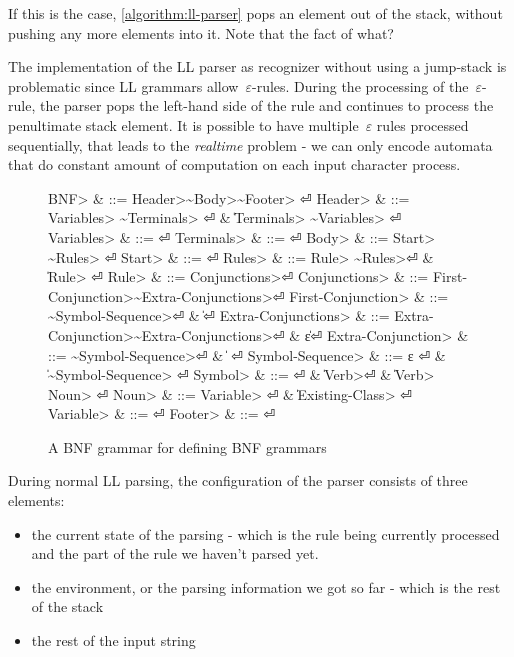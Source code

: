 If this is the case, \cref{algorithm:ll-parser}
pops an element out of the stack, without pushing any more elements into it.
Note that the fact of what?

The implementation of the LL parser as recognizer without using
a jump-stack is problematic since LL grammars allow~$ε$-rules.
During the processing of the~$ε$-rule, the parser pops the
left-hand side of the rule and continues to process the penultimate
stack element.
It is possible to have multiple~$ε$ rules processed sequentially,
that leads to the \textit{realtime} problem - we can only encode
automata that do constant amount of computation on each input character
process.

\begin{figure}[H]
  \begin{Grammar}
    \begin{aligned}
      \<BNF> & ::= \<Header>\~\<Body>\~\<Footer> \hfill⏎
      \<Header> & ::= \<Variables> \~\<Terminals> \hfill⏎
      {} & \| \<Terminals> \~\<Variables> \hfill⏎
      \<Variables> & ::= \hfill⏎
      \<Terminals> & ::= \hfill⏎
      \<Body> & ::= \<Start> \~\<Rules> \hfill⏎
      \<Start> & ::=  \hfill⏎
      \<Rules> & ::= \<Rule> \~\<Rules>\hfill⏎
      {} & \| \<Rule> \hfill⏎
      \<Rule> & ::=  \<Conjunctions>\hfill⏎
      \<Conjunctions> & ::= \<First-Conjunction>\~\<Extra-Conjunctions>\hfill⏎
      \<First-Conjunction> & ::= \~\<Symbol-Sequence>\hfill⏎
      {} & \| \hfill⏎
      \<Extra-Conjunctions> & ::= \<Extra-Conjunction>\~\<Extra-Conjunctions>\hfill⏎
      {} & \| ε\hfill⏎
      \<Extra-Conjunction> & ::= \~\<Symbol-Sequence>\hfill⏎
      {} & \|  \hfill⏎
      \<Symbol-Sequence> & ::= ε \hfill⏎
      {} & \| \~\<Symbol-Sequence> \hfill⏎
      \<Symbol> & ::=  \hfill⏎
      {} & \| \<Verb>\hfill⏎
      {} & \| \<Verb>~\cc{,} \<Noun> \hfill⏎
      \<Noun> & ::= \<Variable> \hfill⏎
      {} & \| \<Existing-Class> \hfill⏎
      \<Variable> & ::=  \hfill⏎
      \<Footer> & ::= \hfill⏎
    \end{aligned}
  \end{Grammar}
  \caption{A BNF grammar for defining BNF grammars}
  \label{figure:BNF:BNF}
\end{figure}
During normal LL parsing, the configuration of the parser consists
  of three elements:
\begin{itemize}
  \item the current state of the parsing - which is the
    rule being currently processed and the part of the rule we
    haven't parsed yet.
  \item the environment, or the parsing information we got so far -
    which is the rest of the stack
  \item the rest of the input string
\end{itemize}


